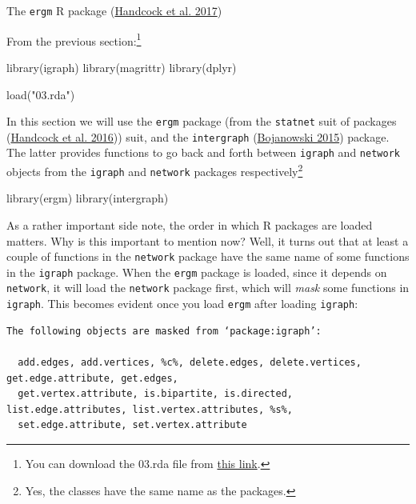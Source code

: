 \documentclass[
]{book}
\newenvironment{Shaded}{\begin{snugshade}}{\end{snugshade}}
\newcommand{\FunctionTok}[1]{\textcolor[rgb]{0.00,0.00,0.00}{#1}}
\newcommand{\NormalTok}[1]{#1}
\newcommand{\StringTok}[1]{\textcolor[rgb]{0.31,0.60,0.02}{#1}}
\begin{document}
The \texttt{ergm} R package (\protect\hyperlink{ref-R-ergm}{Handcock et al. 2017})

From the previous section:\footnote{You can download the 03.rda file from \href{https://github.com/gvegayon/appliedsnar}{this link}.}

\begin{Shaded}
\begin{Highlighting}[]
\FunctionTok{library}\NormalTok{(igraph)}
\FunctionTok{library}\NormalTok{(magrittr)}
\FunctionTok{library}\NormalTok{(dplyr)}

\FunctionTok{load}\NormalTok{(}\StringTok{"03.rda"}\NormalTok{)}
\end{Highlighting}
\end{Shaded}

In this section we will use the \texttt{ergm} package (from the \texttt{statnet} suit of packages (\protect\hyperlink{ref-R-statnet}{Handcock et al. 2016})) suit, and the \texttt{intergraph} (\protect\hyperlink{ref-R-intergraph}{Bojanowski 2015}) package. The latter provides functions to go back and forth between \texttt{igraph} and \texttt{network} objects from the \texttt{igraph} and \texttt{network} packages respectively\footnote{Yes, the classes have the same name as the packages.}

\begin{Shaded}
\begin{Highlighting}[]
\FunctionTok{library}\NormalTok{(ergm)}
\FunctionTok{library}\NormalTok{(intergraph)}
\end{Highlighting}
\end{Shaded}

As a rather important side note, the order in which R packages are loaded matters. Why is this important to mention now? Well, it turns out that at least a couple of functions in the \texttt{network} package have the same name of some functions in the \texttt{igraph} package. When the \texttt{ergm} package is loaded, since it depends on \texttt{network}, it will load the \texttt{network} package first, which will \emph{mask} some functions in \texttt{igraph}. This becomes evident once you load \texttt{ergm} after loading \texttt{igraph}:

\begin{verbatim}
The following objects are masked from ‘package:igraph’:

  add.edges, add.vertices, %c%, delete.edges, delete.vertices, get.edge.attribute, get.edges,
  get.vertex.attribute, is.bipartite, is.directed, list.edge.attributes, list.vertex.attributes, %s%,
  set.edge.attribute, set.vertex.attribute
\end{verbatim}
\end{document}
